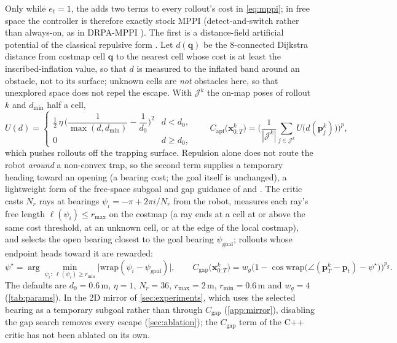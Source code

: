 Only while $e_t=1$, the  adds two terms to every rollout's cost in \eqref{eq:mppi}; in free space the controller is therefore exactly stock MPPI (detect-and-switch rather than always-on, as in DRPA-MPPI \citep{drpa_mppi}). The first is a distance-field artificial potential of the classical repulsive form \citep{khatib_apf}. Let $d(\mathbf{q})$ be the 8-connected Dijkstra distance from costmap cell $\mathbf{q}$ to the nearest cell whose cost is at least the inscribed-inflation value, so that $d$ is measured to the inflated band around an obstacle, not to its surface; unknown cells are \emph{not} obstacles here, so that unexplored space does not repel the escape. With $\mathcal{J}^k$ the on-map poses of rollout $k$ and $d_{\min}$ half a cell,
\begin{equation}\label{eq:apf}
U(d)=\begin{cases}\tfrac12\,\eta\,\Big(\dfrac{1}{\max(d,d_{\min})}-\dfrac{1}{d_0}\Big)^{2} & d<d_0,\\[4pt] 0 & d\ge d_0,\end{cases}\qquad
C_{\mathrm{apf}}\big(\mathbf{x}^k_{0:T}\big)=\Big(\frac{1}{|\mathcal{J}^k|}\sum_{j\in\mathcal{J}^k}U\big(d(\mathbf{p}^k_j)\big)\Big)^{p},
\end{equation}
which pushes rollouts off the trapping surface. Repulsion alone does not route the robot \emph{around} a non-convex trap, so the second term supplies a temporary heading toward an opening (a bearing cost; the goal itself is unchanged), a lightweight form of the free-space subgoal and gap guidance of \citet{gp_mppi} and \citet{potential_gap}. The critic casts $N_r$ rays at bearings $\psi_i=-\pi+2\pi i/N_r$ from the robot, measures each ray's free length $\ell(\psi_i)\le r_{\max}$ on the costmap (a ray ends at a cell at or above the same cost threshold, at an unknown cell, or at the edge of the local costmap), and selects the open bearing closest to the goal bearing $\psi_{\mathrm{goal}}$; rollouts whose endpoint heads toward it are rewarded:
\begin{equation}\label{eq:gap}
\psi^\star=\arg\min_{\psi_i:\;\ell(\psi_i)\ge r_{\min}}\big|\mathrm{wrap}(\psi_i-\psi_{\mathrm{goal}})\big|,\qquad
C_{\mathrm{gap}}\big(\mathbf{x}^k_{0:T}\big)=w_g\Big(1-\cos\mathrm{wrap}\big(\angle(\mathbf{p}^k_T-\mathbf{p}_t)-\psi^\star\big)\Big)^{p_g}.
\end{equation}
The defaults are $d_0=0.6$\,m, $\eta=1$, $N_r=36$, $r_{\max}=2$\,m, $r_{\min}=0.6$\,m and $w_g=4$ (\cref{tab:params}). In the 2D mirror of \cref{sec:experiments}, which uses the selected bearing as a temporary subgoal rather than through $C_{\mathrm{gap}}$ (\cref{app:mirror}), disabling the gap search removes every escape (\cref{sec:ablation}); the $C_{\mathrm{gap}}$ term of the C++ critic has not been ablated on its own.

